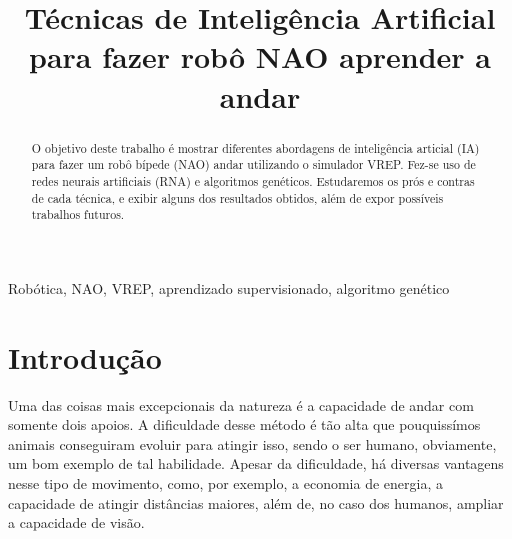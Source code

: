 \documentclass[twoside,conference,a4paper]{IEEEtran}
\begin{document}
\renewcommand{\IEEEkeywordsname}{Palavras-chave}


\title{Técnicas de Inteligência Artificial para fazer robô NAO aprender a andar}
\author{%
}


\maketitle

\begin{abstract}
O objetivo deste trabalho é mostrar diferentes abordagens de inteligência articial (IA) para fazer um robô bípede (NAO) andar utilizando o simulador VREP. Fez-se uso de redes neurais artificiais (RNA) e algoritmos genéticos. Estudaremos os prós e contras de cada técnica, e exibir alguns dos resultados obtidos, além de expor possíveis trabalhos futuros.
\end{abstract}

\begin{IEEEkeywords}
 Robótica, NAO, VREP, aprendizado supervisionado, algoritmo genético
\end{IEEEkeywords}


\section{Introdução}

Uma das coisas mais excepcionais da natureza é a capacidade de andar com somente dois apoios. A dificuldade desse método é tão alta que pouquissímos animais conseguiram evoluir para atingir isso, sendo o ser humano, obviamente, um bom exemplo de tal habilidade. Apesar da dificuldade, há diversas vantagens nesse tipo de movimento, como, por exemplo, a economia de energia, a capacidade de atingir distâncias maiores, além de, no caso dos humanos, ampliar a capacidade de visão.
\end{document}
